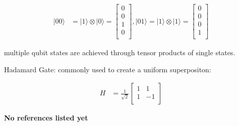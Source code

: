 \documentclass[twocolumn,showpacs,preprintnumbers,amsmath,amssymb]{revtex4}
\begin{document}
		\begin{align*}	
			|00\rangle &= |1\rangle \otimes |0\rangle = \begin{bmatrix}
				0 \\
				0 \\
				1 \\
				0 \\
			\end{bmatrix}, 
			|01\rangle = |1\rangle \otimes |1\rangle = \begin{bmatrix}
				0 \\
				0 \\
				0 \\
				1 \\
			\end{bmatrix}		
		\end{align*}
		
		
		multiple qubit states are achieved through tensor products of single states.
		
		Hadamard Gate: commonly used to create a uniform superpositon:
		
		\begin{align*}	
			H &=\frac{1}{\sqrt{2}} \begin{bmatrix}
				1 & 1 \\
				1 &-1 \\
			\end{bmatrix}
		\end{align*}
		
		
		
		
		\begin{thebibliography}{99}
			
			\textbf{No references listed yet}
			
		\end{thebibliography}
		
		
	
\end{document}
